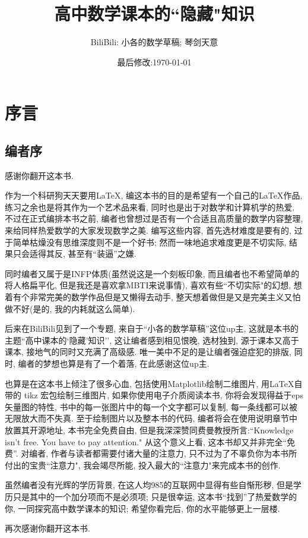 \documentclass{book}
\title{高中数学课本的``隐藏"知识}
\author{BiliBili: 小各的数学草稿; 琴剑天意}
\date{最后修改:\today}
\begin{document}
\maketitle
\tableofcontents
\chapter{序言}
\section{编者序}
感谢你翻开这本书.

作为一个科研狗天天要用\LaTeX, 编这本书的目的是希望有一个自己的\LaTeX 作品, 练习之余也是将其作为一个艺术品来看, 同时也是出于对数学和计算机学的热爱. 不过在正式编排本书之前, 编者也曾想过是否有一个合适且高质量的数学内容整理, 来给同样热爱数学的大家发现数学之美. 编写这些内容, 首先选材难度是要有的, 过于简单枯燥没有思维深度则不是一个好书; 然而一味地追求难度更是不切实际, 结果只会适得其反, 甚至有``装逼''之嫌.

同时编者又属于是INFP体质(虽然说这是一个刻板印象, 而且编者也不希望简单的将人格扁平化, 但是我还是喜欢拿MBTI来说事情), 喜欢有些``不切实际"的幻想, 想着有个非常完美的数学作品但是又懒得去动手, 整天想着做但是又是完美主义又怕做不好(是的, 我的内耗就这么简单).

后来在BiliBili见到了一个专题, 来自于``小各的数学草稿''这位up主, 这就是本书的主题``高中课本的`隐藏'知识'', 这让编者感到相见恨晚, 选材独到, 源于课本又高于课本, 接地气的同时又充满了高级感. 唯一美中不足的是让编者强迫症犯的排版, 同时, 编者的梦想也算是有了一个着落, 在此感谢这位up主.

也算是在这本书上倾注了很多心血, 包括使用Matplotlib绘制二维图片, 用\LaTeX 自带的 tikz 宏包绘制三维图片, 如果你使用电子介质阅读本书, 你将会发现得益于eps矢量图的特性, 书中的每一张图片中的每一个文字都可以复制, 每一条线都可以被无限放大而不失真. 至于绘制图片以及整本书的代码, 编者将会在使用说明章节中放置其开源地址, 本书完全免费自由, 但是我深深赞同费曼教授所言:``Knowledge isn't free. You have to pay attention." 从这个意义上看, 这本书却又并非完全“免费”. 对编者, 作者与读者都需要付诸大量的注意力, 只不过为了不辜负你为本书所付出的宝贵``注意力", 我会竭尽所能, 投入最大的``注意力"来完成本书的创作.

虽然编者没有光辉的学历背景, 在这人均985的互联网中显得有些自惭形秽, 但是学历只是其中的一个加分项而不是必须项; 只是很幸运, 这本书``找到''了热爱数学的你, 一同探究高中数学课本的知识; 希望你看完后, 你的水平能够更上一层楼.

再次感谢你翻开这本书.
\end{document}
